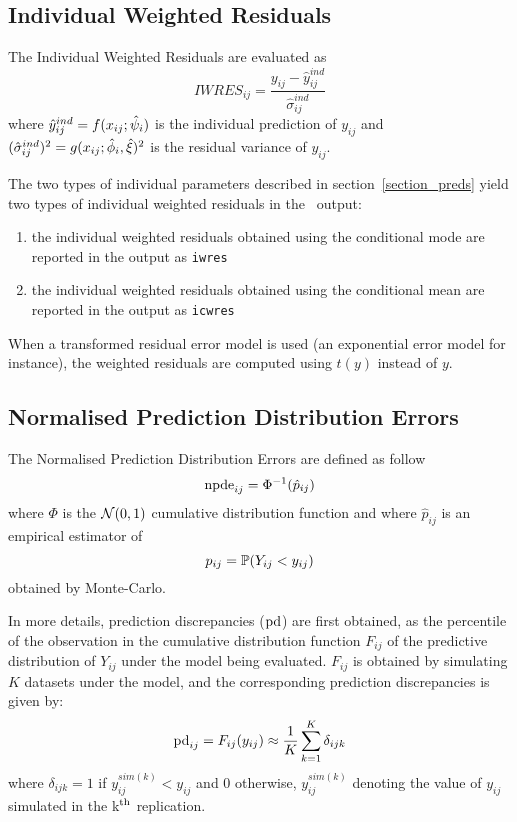 
\subsection{Individual Weighted Residuals}

The Individual Weighted Residuals are evaluated as
$$IWRES_{ij} = \frac{y_{ij} - \hat{y}^{ind}_{ij}} {\hat{\sigma}^{ind}_{ij}}$$
where  $\hat{y}^{ind}_{ij} = f(x_{ij} ; \hat{\psi}_i )$ is the individual prediction of $y_{ij}$ and $(\hat{\sigma}^{ind}_{ij})^2 = g(x_{ij} ; \hat{{\phi}}_i,\hat{\xi})^2$ is the residual variance of $y_{ij}$.

The two types of individual parameters described in section~\ref{section_preds} yield two types of individual weighted residuals in the \monolix~output:
\begin{enumerate}
\item the individual weighted residuals obtained using the conditional mode are reported in the output as \texttt{iwres}
\item the individual weighted residuals obtained using the conditional mean are reported in the output as \texttt{icwres}
\end{enumerate}

 When a transformed residual error model is used (an exponential error model for instance), the weighted residuals are computed using $t(y)$ instead of $y$.

\subsection{Normalised Prediction Distribution Errors}

The Normalised Prediction Distribution Errors are defined as follow
$${\rm npde}_{ij}=\Phi^{-1}(\hat{p}_{ij})$$
where $\Phi$ is the $\mbox{$\mathcal{N}$}(0,1)$ cumulative distribution function and where $\hat{p}_{ij}$ is an empirical estimator of
$$p_{ij} = \mathbb{P}\!\left(Y_{ij}<y_{ij}\right)$$
obtained by Monte-Carlo. 

In more details, prediction discrepancies (${\rm pd}$) are first obtained, as the percentile of the observation in the cumulative distribution function $F_{ij}$ of the predictive distribution of $Y_{ij}$ under the model being evaluated. $F_{ij}$ is obtained by simulating $K$ datasets under the model, and the corresponding prediction discrepancies is given by:
\begin{equation}
{\rm pd}_{ij} = F_{ij}(y_{ij}) \approx \frac{1}{K} \sum_{k=1}^K \delta_{ijk} \label{eq:pdedef}
\end{equation}
where $\delta_{ijk}=1$ if $y_{ij}^{sim(k)} < y_{ij}$ and 0 otherwise, $y_{ij}^{sim(k)}$ denoting the value of $y_{ij}$ simulated in the k$^{\rm th}$ replication.

